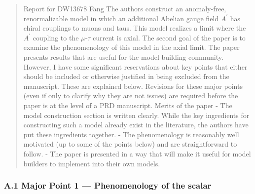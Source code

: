 \documentclass[
  chinese,
  UTF8]{ctexart}
\begin{document}
\begin{quote}
Report for DW13678 Fang The authors construct an anomaly-free,
renormalizable model in which an additional Abelian gauge field
\(A^{\prime}\) has chiral couplings to muons and taus. This model
realizes a limit where the \(A^{\prime}\) coupling to the
\(\mu\)-\(\tau\) current is axial. The second goal of the paper is to
examine the phenomenology of this model in the axial limit. The paper
presents results that are useful for the model building community.
However, I have some significant reservations about key points that
either should be included or otherwise justified in being excluded from
the manuscript. These are explained below. Revisions for these major
points (even if only to clarify why they are not issues) are required
before the paper is at the level of a PRD manuscript. Merits of the
paper - The model construction section is written clearly. While the key
ingredients for constructing such a model already exist in the
literature, the authors have put these ingredients together. - The
phenomenology is reasonably well motivated (up to some of the points
below) and are straightforward to follow. - The paper is presented in a
way that will make it useful for model builders to implement into their
own models.
\end{quote}

\subsubsection{A.1 Major Point 1 --- Phenomenology of the
scalar}\label{a.1-major-point-1-phenomenology-of-the-scalar}
\end{document}
